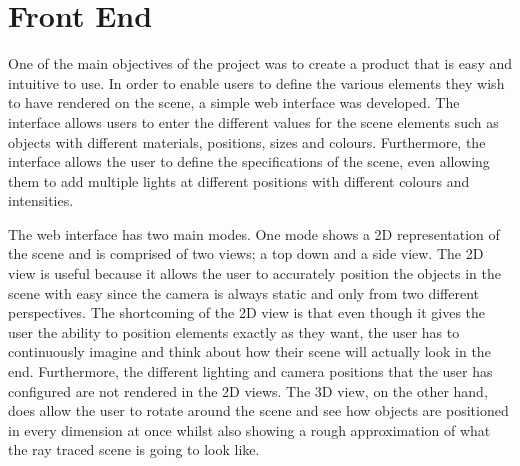 \documentclass[a4paper]{report}
\begin{document}
	\section{Front End}
	One of the main objectives of the project was to create a product that is easy and intuitive to use. In order to enable users to define the various elements they wish to have rendered on the scene, a simple web interface was developed. The interface allows users to enter the different values for the scene elements such as objects with different materials, positions, sizes and colours. Furthermore, the interface allows the user to define the specifications of the scene, even allowing them to add multiple lights at different positions with different colours and intensities.\newline 
	\par The web interface has two main modes. One mode shows a 2D representation of the scene and is comprised of two views; a top down and a side view. The 2D view is useful because it allows the user to accurately position the objects in the scene with easy since the camera is always static and only from two different perspectives. The shortcoming of the 2D view is that even though it gives the user the ability to position elements exactly as they want, the user has to continuously imagine and think about how their scene will actually look in the end. Furthermore, the different lighting and camera positions that the user has configured are not rendered in the 2D views. The 3D view, on the other hand, does allow the user to rotate around the scene and see how objects are positioned in every dimension at once whilst also showing a rough approximation of what the ray traced scene is going to look like. 
\end{document}
